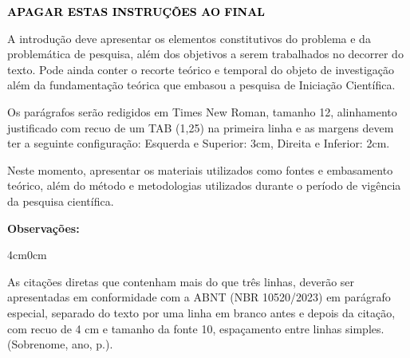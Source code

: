 \begin{center}
\colorbox{docred}{\textbf{\textcolor{black}{APAGAR ESTAS INSTRUÇÕES AO FINAL}}}
\end{center}

\bigskip


\medskip
A introdução deve apresentar os elementos constitutivos do problema e da problemática de pesquisa, além dos objetivos a serem trabalhados no decorrer do texto. Pode ainda conter o recorte teórico e temporal do objeto de investigação além da fundamentação teórica que embasou a pesquisa de Iniciação Científica.

Os parágrafos serão redigidos em Times New Roman, tamanho 12, alinhamento justificado com recuo de um TAB (1,25) na primeira linha e as margens devem ter a seguinte configuração: Esquerda e Superior: 3cm, Direita e Inferior: 2cm.

\bigskip

\medskip
Neste momento, apresentar os materiais utilizados como fontes e embasamento teórico, além do método e metodologias utilizados durante o período de vigência da pesquisa científica.

\bigskip
\noindent\hspace*{1.25cm}\textbf{Observações:}

\medskip
\begin{adjustwidth}{4cm}{0cm}
{\singlespacing\fontsize{10}{12}\selectfont
As citações diretas que contenham mais do que três linhas, deverão ser apresentadas em conformidade com a ABNT (NBR 10520/2023) em parágrafo especial, separado do texto por uma linha em branco antes e depois da citação, com recuo de 4 cm e tamanho da fonte 10, espaçamento entre linhas simples. (Sobrenome, ano, p.).
\par}
\end{adjustwidth}

